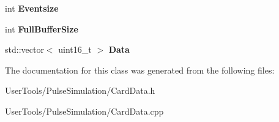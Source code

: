 \begin{DoxyCompactItemize}
\item 
\hypertarget{classCardData_abafe428221ab0987ac51bd7312b29d6b}{
int {\bfseries Eventsize}}
\label{classCardData_abafe428221ab0987ac51bd7312b29d6b}

\item 
\hypertarget{classCardData_a3395d60095ef7aeff93cf2d169a34395}{
int {\bfseries FullBufferSize}}
\label{classCardData_a3395d60095ef7aeff93cf2d169a34395}

\item 
\hypertarget{classCardData_a6190a518c1cc009d169a0f94a333576d}{
std::vector$<$ uint16\_\-t $>$ {\bfseries Data}}
\label{classCardData_a6190a518c1cc009d169a0f94a333576d}

\end{DoxyCompactItemize}


The documentation for this class was generated from the following files:\begin{DoxyCompactItemize}
\item 
UserTools/PulseSimulation/CardData.h\item 
UserTools/PulseSimulation/CardData.cpp\end{DoxyCompactItemize}
